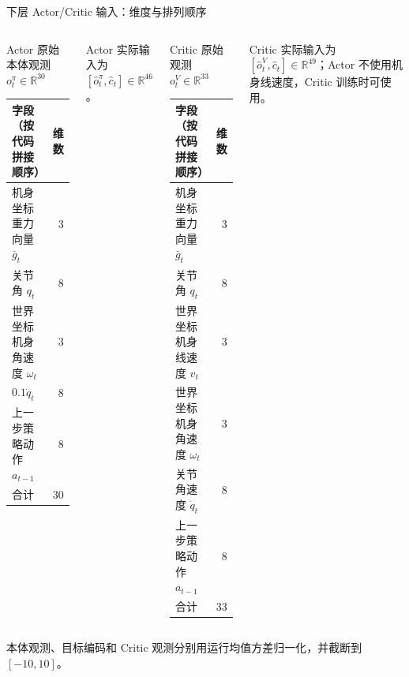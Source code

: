 \documentclass[aspectratio=169,10pt]{beamer}
\begin{document}
\begin{frame}{下层 Actor/Critic 输入：维度与排列顺序}
\scriptsize
\begin{columns}[T,onlytextwidth]
\begin{block}{Actor 原始本体观测 $o_t^\pi\in\mathbb{R}^{30}$}
\begin{tabular}{lr}
\toprule
字段（按代码拼接顺序）& 维数\\
\midrule
机身坐标重力向量 $\bar g_t$ & 3\\
关节角 $q_t$ & 8\\
世界坐标机身角速度 $\omega_t$ & 3\\
$0.1\dot q_t$ & 8\\
上一步策略动作 $a_{t-1}$ & 8\\
\midrule
合计 & 30\\
\bottomrule
\end{tabular}
\end{block}
Actor 实际输入为 $[\hat o_t^\pi,\hat c_t]\in\mathbb{R}^{46}$。
\begin{block}{Critic 原始观测 $o_t^V\in\mathbb{R}^{33}$}
\begin{tabular}{lr}
\toprule
字段（按代码拼接顺序）& 维数\\
\midrule
机身坐标重力向量 $\bar g_t$ & 3\\
关节角 $q_t$ & 8\\
世界坐标机身线速度 $v_t$ & 3\\
世界坐标机身角速度 $\omega_t$ & 3\\
关节角速度 $\dot q_t$ & 8\\
上一步策略动作 $a_{t-1}$ & 8\\
\midrule
合计 & 33\\
\bottomrule
\end{tabular}
\end{block}
Critic 实际输入为 $[\hat o_t^V,\hat c_t]\in\mathbb{R}^{49}$；Actor 不使用机身线速度，Critic 训练时可使用。
\end{columns}
\vspace{0.4em}
本体观测、目标编码和 Critic 观测分别用运行均值方差归一化，并截断到 $[-10,10]$。
\end{frame}
\end{document}
